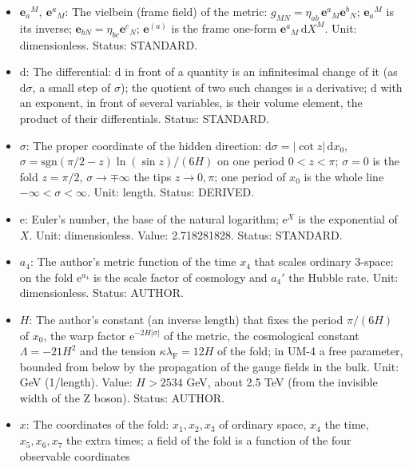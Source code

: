 \documentclass[
  10pt,
]{article}
\providecommand{\tightlist}{%
  \setlength{\itemsep}{0pt}\setlength{\parskip}{0pt}}
\begin{document}
\begin{itemize}
\tightlist
\item
  \(\mathbf{e}_a{}^M,\ \mathbf{e}^a{}_M\): The vielbein (frame field) of
  the metric: \(g_{MN} = \eta_{ab}\,\mathbf{e}^a{}_M\mathbf{e}^b{}_N\);
  \(\mathbf{e}_a{}^M\) is its inverse;
  \(\mathbf{e}_{bN} = \eta_{bc}\mathbf{e}^c{}_N\); \(\mathbf{e}^{(a)}\)
  is the frame one-form \(\mathbf{e}^a{}_M\,\mathrm{d}X^M\). Unit:
  dimensionless. Status: STANDARD.
\item
  \(\mathrm{d}\): The differential: \(\mathrm{d}\) in front of a
  quantity is an infinitesimal change of it (as \(\mathrm{d}\sigma\), a
  small step of \(\sigma\)); the quotient of two such changes is a
  derivative; \(\mathrm{d}\) with an exponent, in front of several
  variables, is their volume element, the product of their
  differentials. Status: STANDARD.
\item
  \(\sigma\): The proper coordinate of the hidden direction:
  \(\mathrm{d}\sigma = \lvert\cot z\rvert\,\mathrm{d}x_0\),
  \(\sigma = \mathrm{sgn}(\pi/2 - z)\ln(\sin z)/(6H)\) on one period
  \(0 < z < \pi\); \(\sigma = 0\) is the fold \(z = \pi/2\),
  \(\sigma \to \mp\infty\) the tips \(z \to 0, \pi\); one period of
  \(x_0\) is the whole line \(-\infty < \sigma < \infty\). Unit: length.
  Status: DERIVED.
\item
  \(\mathrm{e}\): Euler's number, the base of the natural logarithm;
  \(\mathrm{e}^{X}\) is the exponential of \(X\). Unit: dimensionless.
  Value: 2.718281828. Status: STANDARD.
\item
  \(a_4\): The author's metric function of the time \(x_4\) that scales
  ordinary 3-space: on the fold \(\mathrm{e}^{a_4}\) is the scale factor
  of cosmology and \(a_4'\) the Hubble rate. Unit: dimensionless.
  Status: AUTHOR.
\item
  \(H\): The author's constant (an inverse length) that fixes the period
  \(\pi/(6H)\) of \(x_0\), the warp factor
  \(\mathrm{e}^{-2H\lvert\sigma\rvert}\) of the metric, the cosmological
  constant \(\Lambda = -21H^2\) and the tension
  \(\kappa\lambda_{\mathrm{F}} = 12H\) of the fold; in UM-4 a free
  parameter, bounded from below by the propagation of the gauge fields
  in the bulk. Unit: GeV (1/length). Value: \(H > 2534\) GeV, about 2.5
  TeV (from the invisible width of the Z boson). Status: AUTHOR.
\item
  \(x\): The coordinates of the fold: \(x_1, x_2, x_3\) of ordinary
  space, \(x_4\) the time, \(x_5, x_6, x_7\) the extra times; a field of
  the fold is a function of the four observable coordinates

\end{itemize}
\end{document}

